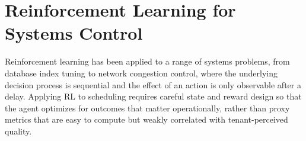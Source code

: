 \section{Reinforcement Learning for Systems Control}
Reinforcement learning has been applied to a range of systems problems,
from database index tuning to network congestion control, where the
underlying decision process is sequential and the effect of an action is
only observable after a delay. Applying RL to scheduling requires careful
state and reward design so that the agent optimizes for outcomes that
matter operationally, rather than proxy metrics that are easy to compute
but weakly correlated with tenant-perceived quality.
